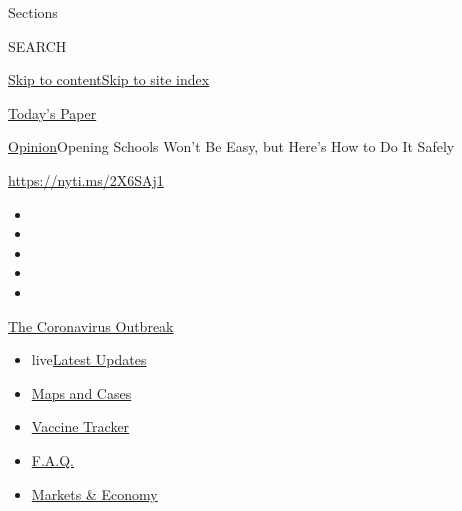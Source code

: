 Sections

SEARCH

\protect\hyperlink{site-content}{Skip to
content}\protect\hyperlink{site-index}{Skip to site index}

\href{https://myaccount.nytimes.com/auth/login?response_type=cookie\&client_id=vi}{}

\href{https://www.nytimes.com/section/todayspaper}{Today's Paper}

\href{/section/opinion}{Opinion}\textbar{}Opening Schools Won't Be Easy,
but Here's How to Do It Safely

\href{https://nyti.ms/2X6SAj1}{https://nyti.ms/2X6SAj1}

\begin{itemize}
\item
\item
\item
\item
\item
\end{itemize}

\href{https://www.nytimes.com/news-event/coronavirus?action=click\&pgtype=Article\&state=default\&region=TOP_BANNER\&context=storylines_menu}{The
Coronavirus Outbreak}

\begin{itemize}
\tightlist
\item
  live\href{https://www.nytimes.com/2020/08/08/world/coronavirus-updates.html?action=click\&pgtype=Article\&state=default\&region=TOP_BANNER\&context=storylines_menu}{Latest
  Updates}
\item
  \href{https://www.nytimes.com/interactive/2020/us/coronavirus-us-cases.html?action=click\&pgtype=Article\&state=default\&region=TOP_BANNER\&context=storylines_menu}{Maps
  and Cases}
\item
  \href{https://www.nytimes.com/interactive/2020/science/coronavirus-vaccine-tracker.html?action=click\&pgtype=Article\&state=default\&region=TOP_BANNER\&context=storylines_menu}{Vaccine
  Tracker}
\item
  \href{https://www.nytimes.com/interactive/2020/world/coronavirus-tips-advice.html?action=click\&pgtype=Article\&state=default\&region=TOP_BANNER\&context=storylines_menu}{F.A.Q.}
\item
  \href{https://www.nytimes.com/live/2020/08/07/business/stock-market-today-coronavirus?action=click\&pgtype=Article\&state=default\&region=TOP_BANNER\&context=storylines_menu}{Markets
  \& Economy}
\end{itemize}

